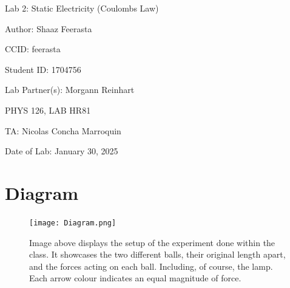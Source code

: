 \documentclass[12pt]{article}
\begin{document}
\pagebreak

\begin{titlepage}
    \begin{center}
        \vspace*{\fill}
        Lab 2: Static Electricity (Coulombs Law)

        Author: Shaaz Feerasta

        CCID: feerasta

        Student ID: 1704756

        Lab Partner(s): Morgann Reinhart

        PHYS 126, LAB HR81

        TA: Nicolas Concha Marroquin

        Date of Lab: January 30, 2025
        \vspace*{\fill}
    \end{center}
\end{titlepage}
\vfill
\pagebreak

\section{Diagram}

\begin{figure}[h]
    \centering
    \texttt{[image: Diagram.png]}
    \caption{Image above displays the setup of the experiment done within the class.
            It showcases the two different balls, their original length apart, and the forces acting on each ball.
            Including, of course, the lamp. Each arrow colour indicates an equal magnitude of force.}
    \label{fig:diagram}
\end{figure}
\end{document}
